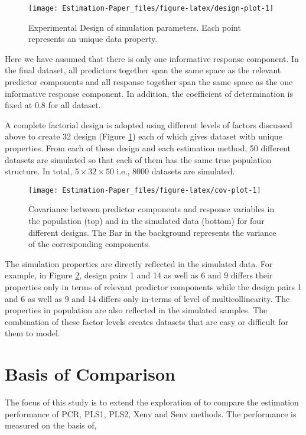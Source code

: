 \documentclass[12pt,3p,authoryear]{elsarticle}
\begin{document}
\begin{figure}
\texttt{[image: Estimation-Paper\_files/figure-latex/design-plot-1]} \caption{Experimental Design of simulation parameters. Each point represents an unique data property.}\label{fig:design-plot}
\end{figure}

Here we have assumed that there is only one informative response component. In the final dataset, all predictors together span the same space as the relevant predictor components and all response together span the same space as the one informative response component. In addition, the coefficient of determination is fixed at 0.8 for all dataset.

A complete factorial design is adopted using different levels of factors discussed above to create 32 design (Figure \ref{fig:design-plot}) each of which gives dataset with unique properties. From each of these design and each estimation method, 50 different datasets are simulated so that each of them has the same true population structure. In total, \(5 \times 32 \times 50\) i.e., 8000 datasets are simulated.



\begin{figure}[H]
\texttt{[image: Estimation-Paper\_files/figure-latex/cov-plot-1]} \caption{Covariance between predictor components and response variables in the population (top) and in the simulated data (bottom) for four different designs. The Bar in the background represents the variance of the corresponding components.}\label{fig:cov-plot}
\end{figure}

The simulation properties are directly reflected in the simulated data. For example, in Figure \ref{fig:cov-plot}, design pairs 1 and 14 as well as 6 and 9 differs their properties only in terms of relevant predictor components while the design pairs 1 and 6 as well as 9 and 14 differs only in-terms of level of multicollinearity. The properties in population are also reflected in the simulated samples. The combination of these factor levels creates datasets that are easy or difficult for them to model.

\hypertarget{basis-of-comparison}{%
\section{Basis of Comparison}\label{basis-of-comparison}}

The focus of this study is to extend the exploration of \citet{rimal2019pred} to compare the estimation performance of PCR, PLS1, PLS2, Xenv and Senv methods. The performance is measured on the basis of,
\end{document}
